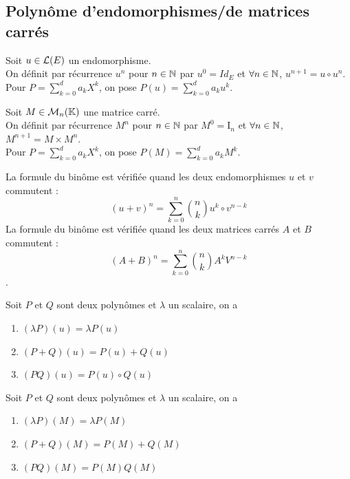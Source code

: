 \documentclass{book}
\begin{document}
\subsection{Polynôme d'endomorphismes/de matrices carrés}

\begin{Definition}
Soit $u\in  \mathcal{L}(E)$ un endomorphisme.\\
On définit par récurrence $u^n$ pour $n\in  \mathbb{N} $ par
$u^0 = Id_{E}$ et $\forall   n\in  \mathbb{N} $, $u^{n+1} = u\circ u^n$.\\
Pour $P = \sum  _{k=0}^d a_k X^k$, on pose $P(u) = \sum  _{k=0}^d a_k u^k$.
\end{Definition}
\begin{Definition}
Soit $M\in  \mathcal{M}_{n}(\mathbb{K})$ une matrice carré.\\
On définit par récurrence $M^n$ pour $n\in  \mathbb{N} $ par
$M^0 = \mathrm {I}_{n}$ et $\forall   n\in  \mathbb{N} $, $M^{n+1} = M\times M^n$.\\
Pour $P = \sum  _{k=0}^d a_k X^k$, on pose $P(M) = \sum  _{k=0}^d a_k M^k$.
\end{Definition}
\begin{Proposition}
La formule du binôme est vérifiée quand les deux endomorphismes $u$ et $v$ commutent  :
$$(u+v)^{{n}}=\sum _{{k=0}}^{{n}}{{\binom  {n}{k}}u^{{k}}\circ v^{{n-k}}}$$
La formule du binôme est vérifiée quand les deux matrices carrés $A$ et $B$ commutent  :
$$(A+B)^{{n}}=\sum _{{k=0}}^{{n}}{{\binom  {n}{k}}A^{{k}} V^{{n-k}}}$$.
\end{Proposition}
\begin{Proposition}[Propriétés]
Soit $P$ et $Q$ sont deux polynômes et $\lambda $ un scalaire, on a
\begin{enumerate}
\item $(\lambda P)(u) = \lambda P(u)$
\item $(P+Q)(u) = P(u) + Q(u)$
\item $(PQ)(u) = P(u)\circ Q(u)$
\end{enumerate}
\end{Proposition}
\begin{Proposition}[Propriétés]
Soit $P$ et $Q$ sont deux polynômes et $\lambda $ un scalaire, on a
\begin{enumerate}
\item $(\lambda P)(M) = \lambda P(M)$
\item $(P+Q)(M) = P(M) + Q(M)$
\item $(PQ)(M) = P(M) Q(M)$
\end{enumerate}
\end{Proposition}
\end{document}
